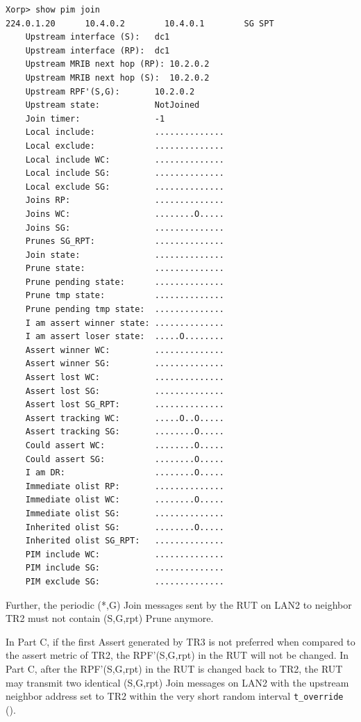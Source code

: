 \documentclass[11pt]{report}
\begin{document}
\begin{itemize}
\begin{verbatim}
Xorp> show pim join 
224.0.1.20      10.4.0.2        10.4.0.1        SG SPT 
    Upstream interface (S):   dc1
    Upstream interface (RP):  dc1
    Upstream MRIB next hop (RP): 10.2.0.2
    Upstream MRIB next hop (S):  10.2.0.2
    Upstream RPF'(S,G):       10.2.0.2
    Upstream state:           NotJoined 
    Join timer:               -1
    Local include:            ..............
    Local exclude:            ..............
    Local include WC:         ..............
    Local include SG:         ..............
    Local exclude SG:         ..............
    Joins RP:                 ..............
    Joins WC:                 ........O.....
    Joins SG:                 ..............
    Prunes SG_RPT:            ..............
    Join state:               ..............
    Prune state:              ..............
    Prune pending state:      ..............
    Prune tmp state:          ..............
    Prune pending tmp state:  ..............
    I am assert winner state: ..............
    I am assert loser state:  .....O........
    Assert winner WC:         ..............
    Assert winner SG:         ..............
    Assert lost WC:           ..............
    Assert lost SG:           ..............
    Assert lost SG_RPT:       ..............
    Assert tracking WC:       .....O..O.....
    Assert tracking SG:       ........O.....
    Could assert WC:          ........O.....
    Could assert SG:          ........O.....
    I am DR:                  ........O.....
    Immediate olist RP:       ..............
    Immediate olist WC:       ........O.....
    Immediate olist SG:       ..............
    Inherited olist SG:       ........O.....
    Inherited olist SG_RPT:   ..............
    PIM include WC:           ..............
    PIM include SG:           ..............
    PIM exclude SG:           ..............
\end{verbatim}

  Further, the periodic (*,G) Join messages sent by the RUT on LAN2 to
  neighbor TR2 must not contain (S,G,rpt) Prune anymore.

\end{itemize}


In Part C, if the first Assert generated by TR3 is not preferred when compared
to the assert metric of TR2, the RPF'(S,G,rpt) in the RUT will not be changed.
In Part C, after the RPF'(S,G,rpt) in the RUT is changed back to TR2, the RUT
may transmit two identical (S,G,rpt) Join messages on LAN2 with the upstream
neighbor address set to TR2 within the very short random interval
\verb=t_override= ({\PimsmTOverride}).
\end{document}
